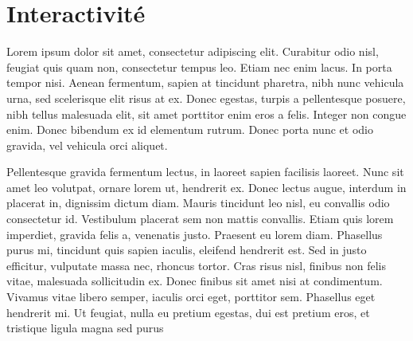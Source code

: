 \chapter*{Interactivité}
\label{s:interactivite}

Lorem ipsum dolor sit amet, consectetur adipiscing elit. Curabitur odio nisl, feugiat quis quam non, consectetur tempus leo. Etiam nec enim lacus. In porta tempor nisi. Aenean fermentum, sapien at tincidunt pharetra, nibh nunc vehicula urna, sed scelerisque elit risus at ex. Donec egestas, turpis a pellentesque posuere, nibh tellus malesuada elit, sit amet porttitor enim eros a felis. Integer non congue enim. Donec bibendum ex id elementum rutrum. Donec porta nunc et odio gravida, vel vehicula orci aliquet.

Pellentesque gravida fermentum lectus, in laoreet sapien facilisis laoreet. Nunc sit amet leo volutpat, ornare lorem ut, hendrerit ex. Donec lectus augue, interdum in placerat in, dignissim dictum diam. Mauris tincidunt leo nisl, eu convallis odio consectetur id. Vestibulum placerat sem non mattis convallis. Etiam quis lorem imperdiet, gravida felis a, venenatis justo. Praesent eu lorem diam. Phasellus purus mi, tincidunt quis sapien iaculis, eleifend hendrerit est. Sed in justo efficitur, vulputate massa nec, rhoncus tortor. Cras risus nisl, finibus non felis vitae, malesuada sollicitudin ex. Donec finibus sit amet nisi at condimentum. Vivamus vitae libero semper, iaculis orci eget, porttitor sem. Phasellus eget hendrerit mi. Ut feugiat, nulla eu pretium egestas, dui est pretium eros, et tristique ligula magna sed purus